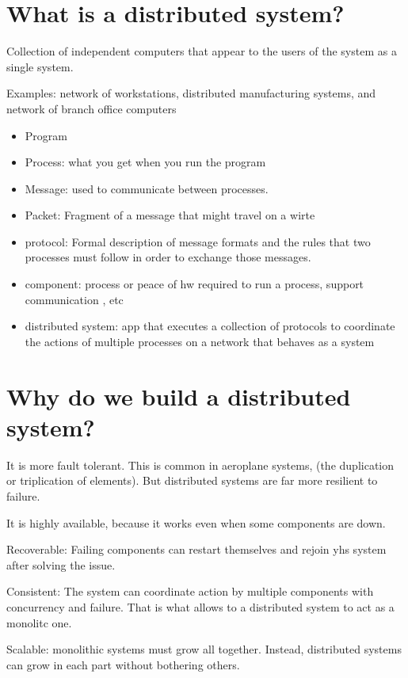 
\section{What is a distributed system?}

Collection of independent computers that appear to the users of the system as a single system.

Examples: network of workstations, distributed manufacturing systems, and network of branch office computers

\begin{itemize}
\item Program
\item Process: what you get when you run the program
\item Message: used to communicate between processes.
\item Packet: Fragment of a message that might travel on a wirte
\item protocol: Formal description of message formats and the rules that two processes must follow in order to exchange those messages.
\item component: process or peace of hw required to run a process, support communication , etc
\item distributed system: app that executes a collection of protocols to coordinate the actions of multiple processes on a network that behaves as a system 
  
\end{itemize}

\section{Why do we build a distributed system?}

It is more fault tolerant. This is common in aeroplane systems, (the duplication or triplication of elements). But distributed systems are far more resilient to failure.

It is highly available, because it works even when some components are down.

Recoverable: Failing components can restart themselves and rejoin yhs system after solving the issue.

Consistent: The system can coordinate action by multiple components with concurrency and failure. That is what allows to a distributed system to act as a monolitc one.

Scalable: monolithic systems must grow all together. Instead, distributed systems can grow in each part without bothering others.

